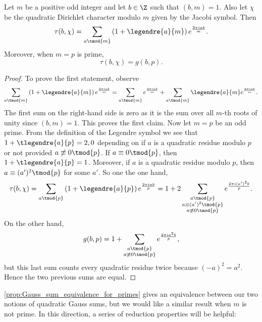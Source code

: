         \begin{proposition}\label{prop:Gauss_sum_equivalence_for_primes}
          Let $m$ be a positive odd integer and let $b \in \Z$ such that $(b,m) = 1$. Also let $\chi$ be the quadratic Dirichlet character modulo $m$ given by the Jacobi symbol. Then
          \[
            \tau(b,\chi) = \sum_{a \tmod{m}}\left(1+\legendre{a}{m}\right)e^{\frac{2\pi iab}{m}}.
          \]
          Moreover, when $m = p$ is prime,
          \[
            \tau(b,\chi) = g(b,p).
          \]
        \end{proposition}
        \begin{proof}
          To prove the first statement, observe
          \[
            \sum_{a \tmod{m}}\left(1+\legendre{a}{m}\right)e^{\frac{2\pi iab}{m}} = \sum_{a \tmod{m}}e^{\frac{2\pi iab}{m}}+\sum_{a \tmod{m}}\legendre{a}{m}e^{\frac{2\pi iab}{m}}.
          \]
          The first sum on the right-hand side is zero as it is the sum over all $m$-th roots of unity since $(b,m) = 1$. This proves the first claim. Now let $m = p$ be an odd prime. From the definition of the Legendre symbol we see that $1+\tlegendre{a}{p} = 2,0$ depending on if $a$ is a quadratic residue modulo $p$ or not provided $a \not\equiv 0 \tmod{p}$. If $a \equiv 0 \tmod{p}$, then $1+\tlegendre{a}{p} = 1$. Moreover, if $a$ is a quadratic residue modulo $p$, then $a \equiv (a')^{2} \tmod{p}$ for some $a'$. So one the one hand,
          \[
            \tau(b,\chi) = \sum_{a \tmod{p}}\left(1+\legendre{a}{p}\right)e^{\frac{2\pi iab}{p}} = 1+2\sum_{\substack{a \tmod{p} \\ a \equiv (a')^{2} \tmod{p} \\ a \not\equiv 0 \tmod{p}}}e^{\frac{2\pi i(a')^{2}b}{p}}.
          \]
          On the other hand,
          \[
            g(b,p) = 1+\sum_{\substack{a \tmod{p} \\ a \not\equiv 0 \tmod{p}}}e^{\frac{2\pi ia^{2}b}{p}},
          \]
          but this last sum counts every quadratic residue twice because $(-a)^{2} = a^{2}$. Hence the two previous sums are equal.
        \end{proof}

        \cref{prop:Gauss_sum_equivalence_for_primes} gives an equivalence between our two notions of quadratic Gauss sums, but we would like a similar result when $m$ is not prime. In this direction, a series of reduction properties will be helpful:


